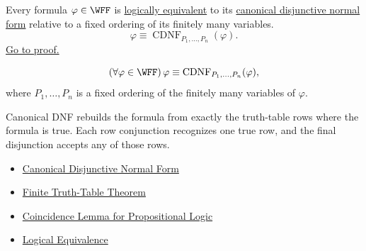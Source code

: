 \begin{tcolorbox}[colback=thmbox, colframe=thmborder, arc=2pt, left=6pt, right=6pt, top=4pt, bottom=4pt, title={\small\textbf{Theorem (Canonical Disjunctive Normal Form)}}]
\begin{theorem}
\label{thm:canonical-disjunctive-normal-form-propositional-logic}
Every formula \(\varphi\in\WFF\) is
\hyperref[def:logical-equivalence-propositional-logic]{logically equivalent}
to its
\hyperref[def:canonical-disjunctive-normal-form-propositional-logic]{canonical disjunctive normal form}
relative to a fixed ordering of its finitely many variables.
\[
\varphi\equiv \operatorname{CDNF}_{P_1,\ldots,P_n}(\varphi).
\]
\noindent\hyperref[prf:canonical-disjunctive-normal-form-propositional-logic]{Go to proof.}
\end{theorem}
\end{tcolorbox}

\begin{remark*}
\[
(\forall\varphi\in\WFF)\,
\varphi\equiv \mathrm{CDNF}_{P_1,\ldots,P_n}(\varphi),
\]
where \(P_1,\ldots,P_n\) is a fixed ordering of the finitely many variables of
\(\varphi\).
\end{remark*}

\begin{remark*}[Interpretation]
Canonical DNF rebuilds the formula from exactly the truth-table rows where the
formula is true. Each row conjunction recognizes one true row, and the final
disjunction accepts any of those rows.
\end{remark*}

\begin{dependencies}
\begin{itemize}
  \item \hyperref[def:canonical-disjunctive-normal-form-propositional-logic]{Canonical Disjunctive Normal Form}
  \item \hyperref[thm:finite-truth-table-propositional-logic]{Finite Truth-Table Theorem}
  \item \hyperref[lem:coincidence-lemma-propositional-logic]{Coincidence Lemma for Propositional Logic}
  \item \hyperref[def:logical-equivalence-propositional-logic]{Logical Equivalence}
\end{itemize}
\end{dependencies}

